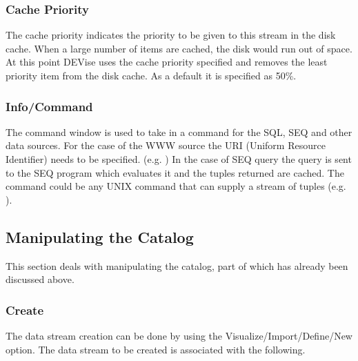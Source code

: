 \subsubsection{Cache Priority}

The cache priority indicates the priority to be given to this stream in the disk
cache. When a large number of items are cached, the disk would run out of
space. At this point DEVise uses the cache priority specified and removes the
least priority item from the disk cache. As a default it is specified as 50\%.

\subsubsection{Info/Command}

The command window is used to take in a command for the SQL, SEQ and other data
sources. For the case of the WWW source the URI (Uniform Resource Identifier)
needs to be specified. (e.g. ) In the case of SEQ query the
query is sent to the SEQ program which evaluates it and the tuples returned are
cached. The command could be any UNIX command that can supply a stream of tuples
(e.g. ).

\subsection{Manipulating the Catalog}

This section deals with manipulating the catalog, part of which has already been
discussed above.

\subsubsection{Create}

The data stream creation can be done by using the Visualize/Import/Define/New
option.  The data stream to be created is associated with the following.

